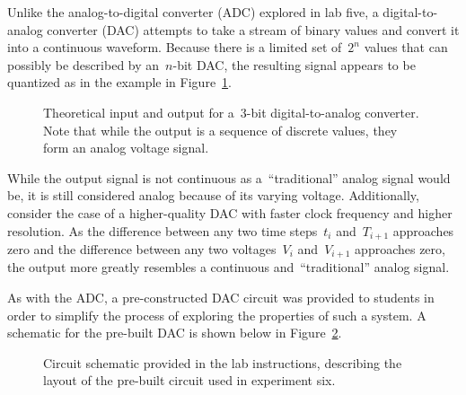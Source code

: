 Unlike the analog-to-digital converter (ADC) explored in lab five, a digital-to-analog converter (DAC) attempts to take a stream of binary values and convert it into a continuous waveform.  Because there is a limited set of~$2^n$ values that can possibly be described by an~$n$-bit DAC, the resulting signal appears to be quantized as in the example in Figure~\ref{fig:theory}.
%
\begin{figure}[H]
	\centering
	
	\parbox{.6\textwidth}{
	\caption[Theory Plot]{Theoretical input and output for a~3-bit digital-to-analog converter.  Note that while the output is a sequence of discrete values, they form an analog voltage signal.}
	\label{fig:theory}}
\end{figure}
%
While the output signal is not continuous as a~``traditional'' analog signal would be, it is still considered analog because of its varying voltage.  Additionally, consider the case of a higher-quality DAC with faster clock frequency and higher resolution.  As the difference between any two time steps~$t_i$ and~$T_{i+1}$ approaches zero and the difference between any two voltages~$V_i$ and~$V_{i+1}$ approaches zero, the output more greatly resembles a continuous and~``traditional'' analog signal.

As with the ADC, a pre-constructed DAC circuit was provided to students in order to simplify the process of exploring the properties of such a system.  A schematic for the pre-built DAC is shown below in Figure~\ref{fig:dacSchem}.
%
\begin{figure}[H]
	\centering
	
	\parbox{.6\textwidth}{
	\caption[Digital-to-Analog IC schematic]{Circuit schematic provided in the
	lab instructions, describing the layout of the pre-built circuit used in
	experiment six.}
	\label{fig:dacSchem}}
\end{figure}
%
